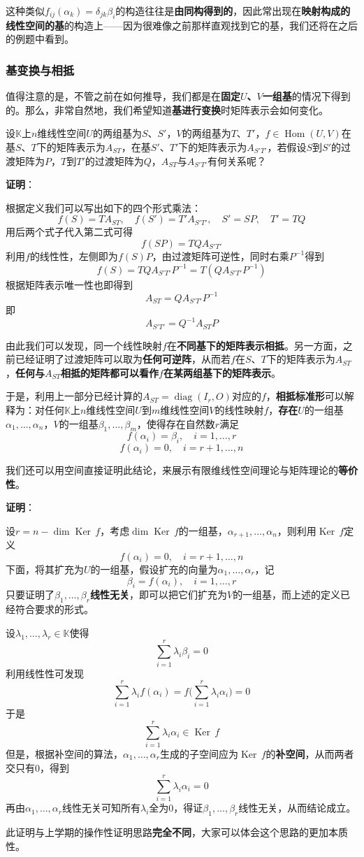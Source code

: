 \documentclass[a4paper,UTF8,fontset=windows,AutoFakeBold]{ctexart}
\DeclareMathOperator{\diag}{diag}
\DeclareMathOperator{\Ker}{Ker\,}
\DeclareMathOperator{\Hom}{Hom}
\newcommand*{\note}{\noindent *}
\newcommand{\proo}[1]{{\vspace{5pt}\kaishu\noindent\textbf{证明}：\vspace{-3pt}
\begin{compactitem}
    \item[] #1
\end{compactitem}
}}
\begin{document}
\note 这种类似$f_{ij}(\alpha_k)=\delta_{jk}\beta_i$的构造往往是\textbf{由同构得到的}，因此常出现在\textbf{映射构成的线性空间的基}的构造上——因为很难像之前那样直观找到它的基，我们还将在之后的例题中看到。

\subsubsection{基变换与相抵}
值得注意的是，不管之前在如何推导，我们都是在\textbf{固定$U$、$V$一组基}的情况下得到的。那么，非常自然地，我们希望知道\textbf{基进行变换}时矩阵表示会如何变化。

设$\mathbb{K}$上$n$维线性空间$U$的两组基为$S$、$S'$，$V$的两组基为$T$、$T'$，$f\in\Hom(U,V)$在基$S$、$T$下的矩阵表示为$A_{ST}$，在基$S'$、$T'$下的矩阵表示为$A_{S'T'}$，若假设$S$到$S'$的过渡矩阵为$P$，$T$到$T'$的过渡矩阵为$Q$，$A_{ST}$与$A_{S'T'}$有何关系呢？

\proo{
    根据定义我们可以写出如下的四个形式乘法：
    $$f(S)=TA_{ST},\quad f(S')=T'A_{S'T'},\quad S'=SP,\quad T'=TQ$$
    用后两个式子代入第二式可得
    $$f(SP)=TQA_{S'T'}$$
    利用$f$的线性性，左侧即为$f(S)P$，由过渡矩阵可逆性，同时右乘$P^{-1}$得到
    $$f(S)=TQA_{S'T'}P^{-1}=T(QA_{S'T'}P^{-1})$$
    根据矩阵表示唯一性也即得到
    $$A_{ST}=QA_{S'T'}P^{-1}$$
    即
    $$A_{S'T'}=Q^{-1}A_{ST}P$$
}

由此我们可以发现，同一个线性映射$f$在\textbf{不同基下的矩阵表示相抵}。另一方面，之前已经证明了过渡矩阵可以取为\textbf{任何可逆阵}，从而若$f$在$S$、$T$下的矩阵表示为$A_{ST}$，\textbf{任何与$A_{ST}$相抵的矩阵都可以看作$f$在某两组基下的矩阵表示}。

于是，利用上一部分已经计算的$A_{ST}=\diag(I_r,O)$对应的$f$，\textbf{相抵标准形}可以解释为：对任何$\mathbb{K}$上$n$维线性空间$U$到$m$维线性空间$V$的线性映射$f$，\textbf{存在}$U$的一组基$\alpha_1,\dots,\alpha_n$，$V$的一组基$\beta_1,\dots,\beta_m$，使得存在自然数$r$满足
$$f(\alpha_i)=\beta_i,\quad i=1,\dots,r$$
$$f(\alpha_i)=0,\quad i=r+1,\dots,n$$

我们还可以用空间直接证明此结论，来展示有限维线性空间理论与矩阵理论的\textbf{等价性}。

\proo{
    设$r=n-\dim\Ker f$，考虑$\dim\Ker f$的一组基，$\alpha_{r+1},\dots,\alpha_n$，则利用$\Ker f$定义
    $$f(\alpha_i)=0,\quad i=r+1,\dots,n$$
    下面，将其扩充为$U$的一组基，假设扩充的向量为$\alpha_1,\dots,\alpha_r$，记
    $$\beta_i=f(\alpha_i),\quad i=1,\dots,r$$
    只要证明了$\beta_1,\dots,\beta_r$\textbf{线性无关}，即可以把它们扩充为$V$的一组基，而上述的定义已经符合要求的形式。

    设$\lambda_1,\dots,\lambda_r\in\mathbb{K}$使得
    $$\sum_{i=1}^r\lambda_i\beta_i=0$$
    利用线性性可发现
    $$\sum_{i=1}^r\lambda_if(\alpha_i)=f\bigg(\sum_{i=1}^r\lambda_i\alpha_i\bigg)=0$$
    于是
    $$\sum_{i=1}^r\lambda_i\alpha_i\in\Ker f$$
    但是，根据补空间的算法，$\alpha_1,\dots,\alpha_r$生成的子空间应为$\Ker f$的\textbf{补空间}，从而两者交只有0，得到
    $$\sum_{i=1}^r\lambda_i\alpha_i=0$$
    再由$\alpha_1,\dots,\alpha_r$线性无关可知所有$\lambda_i$全为0，得证$\beta_1,\dots,\beta_r$线性无关，从而结论成立。

    \note 此证明与上学期的操作性证明思路\textbf{完全不同}，大家可以体会这个思路的更加本质性。
}
\end{document}
